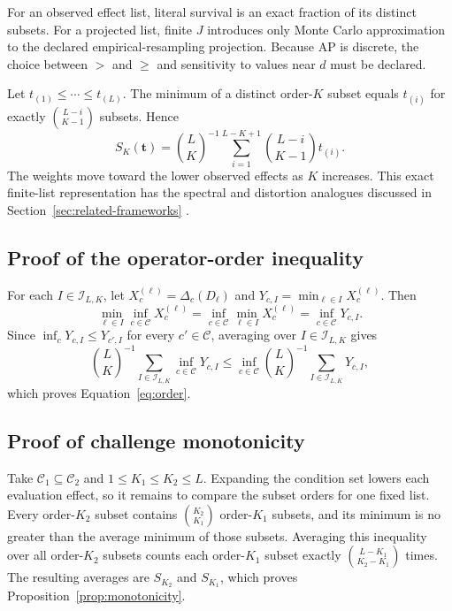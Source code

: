 \documentclass[11pt]{article}
\newcommand{\CSet}{\mathcal{C}}
\theoremstyle{remark}
\begin{document}
For an observed effect list, literal survival is an exact fraction of its
distinct subsets. For a projected list, finite $J$ introduces only Monte Carlo
approximation to the declared empirical-resampling projection. Because AP is
discrete, the choice between $>$ and $\geq$ and sensitivity to values near $d$
must be declared.

Let $t_{(1)}\leq\cdots\leq t_{(L)}$. The minimum of a distinct order-$K$
subset equals $t_{(i)}$ for exactly $\binom{L-i}{K-1}$ subsets. Hence
\begin{equation}
S_K(\mathbf t)
=
\binom{L}{K}^{-1}
\sum_{i=1}^{L-K+1}
\binom{L-i}{K-1}t_{(i)}.
\label{eq:quantile-weight}
\end{equation}
The weights move toward the lower observed effects as $K$ increases. This exact
finite-list representation has the spectral and distortion analogues discussed
in Section~\ref{sec:related-frameworks} \cite{acerbi2002spectral,wang1996premium}.

\subsection{Proof of the operator-order inequality}

For each $I\in\mathcal I_{L,K}$, let
$X_c^{(\ell)}=\Delta_c(D_\ell)$ and
$Y_{c,I}=\min_{\ell\in I}X_c^{(\ell)}$. Then
\[
\min_{\ell\in I}\inf_{c\in\CSet}X_c^{(\ell)}
=
\inf_{c\in\CSet}\min_{\ell\in I}X_c^{(\ell)}
=
\inf_{c\in\CSet}Y_{c,I}.
\]
Since $\inf_c Y_{c,I}\leq Y_{c',I}$ for every $c'\in\CSet$, averaging
over $I\in\mathcal I_{L,K}$ gives
\[
\binom{L}{K}^{-1}\sum_{I\in\mathcal I_{L,K}}
\inf_{c\in\CSet}Y_{c,I}
\leq
\inf_{c\in\CSet}
\binom{L}{K}^{-1}\sum_{I\in\mathcal I_{L,K}}Y_{c,I},
\]
which proves Equation~\eqref{eq:order}.

\subsection{Proof of challenge monotonicity}

Take $\mathcal C_1\subseteq\mathcal C_2$ and
$1\leq K_1\leq K_2\leq L$. Expanding the condition set lowers each
evaluation effect, so it remains to compare the subset orders for one fixed
list. Every order-$K_2$ subset contains $\binom{K_2}{K_1}$ order-$K_1$
subsets, and its minimum is no greater than the average minimum of those
subsets. Averaging this inequality over all order-$K_2$ subsets counts each
order-$K_1$ subset exactly $\binom{L-K_1}{K_2-K_1}$ times. The resulting
averages are $S_{K_2}$ and $S_{K_1}$, which proves
Proposition~\ref{prop:monotonicity}.
\end{document}
